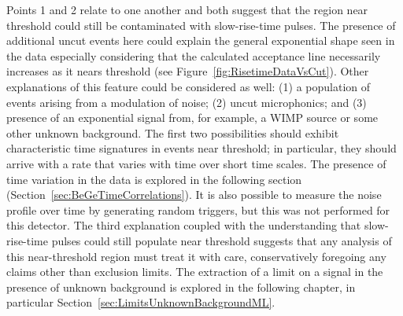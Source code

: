 	Points 1 and 2 relate to one another and both suggest that the region near threshold could still be contaminated with slow-rise-time pulses.  The presence of additional uncut events here could explain the general exponential shape seen in the data especially considering that the calculated acceptance line necessarily increases as it nears threshold (see Figure~\ref{fig:RisetimeDataVsCut}).  Other explanations of this feature could be considered as well: (1) a population of events arising from a modulation of noise; (2) uncut microphonics; and (3) presence of an exponential signal from, for example, a WIMP source or some other unknown background.  The first two possibilities should exhibit characteristic time signatures in events near threshold; in particular, they should arrive with a rate that varies with time over short time scales.  The presence of time variation in the data is explored in the following section (Section~\ref{sec:BeGeTimeCorrelations}).  It is also possible to measure the noise profile over time by generating random triggers, but this was not performed for this detector.  The third explanation coupled with the understanding that slow-rise-time pulses could still populate near threshold suggests that any analysis of this near-threshold region must treat it with care, conservatively foregoing any claims other than exclusion limits.  The extraction of a limit on a signal in the presence of unknown background is explored in the following chapter, in particular Section~\ref{sec:LimitsUnknownBackgroundML}.  
	
